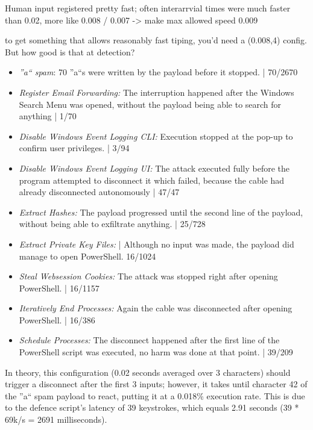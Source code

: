 Human input registered pretty fast; often interarrvial times were much faster than 0.02, more like 0.008 / 0.007 -> make max allowed speed 0.009

to get something that allows reasonably fast tiping, you'd need a (0.008,4) config. But how good is that at detection?


\begin{itemize}
    \item  \emph{''a`` spam}: 70 ''a``s were written by the payload before it stopped. | 70/2670
    \item  \emph{Register Email Forwarding:} The interruption happened after the Windows Search Menu was opened, without the payload being able to search for anything  |  1/70 
    \item  \emph{Disable Windows Event Logging CLI:}  Execution stopped at the pop-up to confirm user privileges. | 3/94
    \item  \emph{Disable Windows Event Logging UI:} The attack executed fully before the program attempted to disconnect it which failed, because the cable had already disconnected autonomously | 47/47
    \item  \emph{Extract Hashes:}  The payload progressed until the second line of the payload, without being able to exfiltrate anything. | 25/728 
    \item  \emph{Extract Private Key Files:}  | Although no input was made, the payload did manage to open PowerShell. 16/1024
    \item  \emph{Steal Websession Cookies:} The attack was stopped right after opening PowerShell. | 16/1157
    \item  \emph{Iteratively End Processes:} Again the cable was disconnected after opening PowerShell. | 16/386
    \item  \emph{Schedule Processes:} The disconnect happened after the first line of the PowerShell script was executed, no harm was done at that point. | 39/209
\end{itemize}






In theory, this configuration (0.02 seconds averaged over 3 characters) should trigger a disconnect after the first 3 inputs; however, it takes until character 42 of the ''a`` spam payload to react, putting it at a 0.018\% execution rate. This is due to the defence script's latency of 39 keystrokes, which equals 2.91 seconds (39 * 69k/s = 2691 milliseconds).

